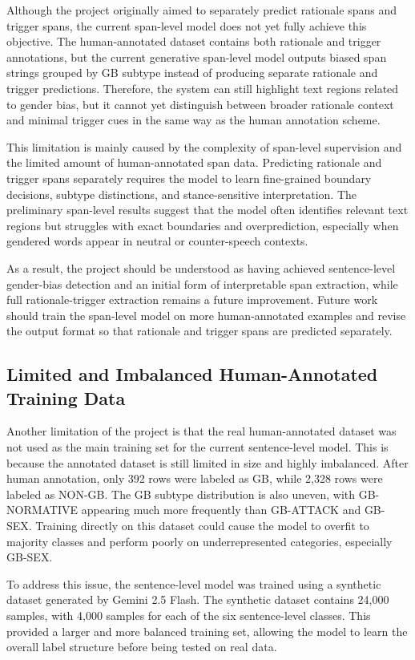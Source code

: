 \documentclass[12pt,oneside,openright,a4paper]{cpe-english-project}
\begin{document}
Although the project originally aimed to separately predict rationale spans and trigger spans, the current span-level model does not yet fully achieve this objective. The human-annotated dataset contains both rationale and trigger annotations, but the current generative span-level model outputs biased span strings grouped by GB subtype instead of producing separate rationale and trigger predictions. Therefore, the system can still highlight text regions related to gender bias, but it cannot yet distinguish between broader rationale context and minimal trigger cues in the same way as the human annotation scheme.

This limitation is mainly caused by the complexity of span-level supervision and the limited amount of human-annotated span data. Predicting rationale and trigger spans separately requires the model to learn fine-grained boundary decisions, subtype distinctions, and stance-sensitive interpretation. The preliminary span-level results suggest that the model often identifies relevant text regions but struggles with exact boundaries and overprediction, especially when gendered words appear in neutral or counter-speech contexts.

As a result, the project should be understood as having achieved sentence-level gender-bias detection and an initial form of interpretable span extraction, while full rationale-trigger extraction remains a future improvement. Future work should train the span-level model on more human-annotated examples and revise the output format so that rationale and trigger spans are predicted separately.

\subsection{Limited and Imbalanced Human-Annotated Training Data}

Another limitation of the project is that the real human-annotated dataset was not used as the main training set for the current sentence-level model. This is because the annotated dataset is still limited in size and highly imbalanced. After human annotation, only 392 rows were labeled as GB, while 2,328 rows were labeled as NON-GB. The GB subtype distribution is also uneven, with GB-NORMATIVE appearing much more frequently than GB-ATTACK and GB-SEX. Training directly on this dataset could cause the model to overfit to majority classes and perform poorly on underrepresented categories, especially GB-SEX.

To address this issue, the sentence-level model was trained using a synthetic dataset generated by Gemini 2.5 Flash. The synthetic dataset contains 24,000 samples, with 4,000 samples for each of the six sentence-level classes. This provided a larger and more balanced training set, allowing the model to learn the overall label structure before being tested on real data.
\end{document}
